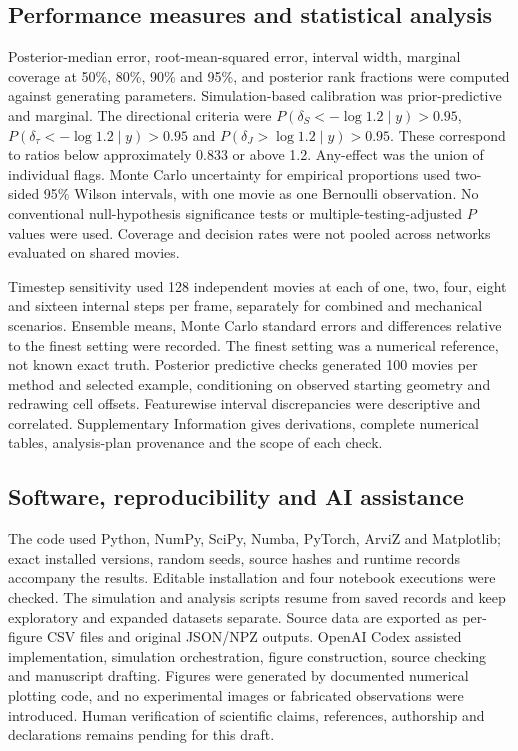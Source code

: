 \documentclass[12pt]{article}
\begin{document}
\subsection*{Performance measures and statistical analysis}
Posterior-median error, root-mean-squared error, interval width, marginal coverage at 50\%, 80\%, 90\% and 95\%, and posterior rank fractions were computed against generating parameters. Simulation-based calibration was prior-predictive and marginal\citep{talts2018,sailynoja2022}. The directional criteria were $P(\delta_S<-\log1.2\mid y)>0.95$, $P(\delta_\tau<-\log1.2\mid y)>0.95$ and $P(\delta_J>\log1.2\mid y)>0.95$. These correspond to ratios below approximately 0.833 or above 1.2. Any-effect was the union of individual flags. Monte Carlo uncertainty for empirical proportions used two-sided 95\% Wilson intervals, with one movie as one Bernoulli observation. No conventional null-hypothesis significance tests or multiple-testing-adjusted $P$ values were used. Coverage and decision rates were not pooled across networks evaluated on shared movies.

Timestep sensitivity used 128 independent movies at each of one, two, four, eight and sixteen internal steps per frame, separately for combined and mechanical scenarios. Ensemble means, Monte Carlo standard errors and differences relative to the finest setting were recorded. The finest setting was a numerical reference, not known exact truth. Posterior predictive checks generated 100 movies per method and selected example, conditioning on observed starting geometry and redrawing cell offsets. Featurewise interval discrepancies were descriptive and correlated. Supplementary Information gives derivations, complete numerical tables, analysis-plan provenance and the scope of each check.

\subsection*{Software, reproducibility and AI assistance}
The code used Python, NumPy, SciPy, Numba, PyTorch, ArviZ and Matplotlib; exact installed versions, random seeds, source hashes and runtime records accompany the results. Editable installation and four notebook executions were checked. The simulation and analysis scripts resume from saved records and keep exploratory and expanded datasets separate. Source data are exported as per-figure CSV files and original JSON/NPZ outputs. OpenAI Codex assisted implementation, simulation orchestration, figure construction, source checking and manuscript drafting. Figures were generated by documented numerical plotting code, and no experimental images or fabricated observations were introduced. Human verification of scientific claims, references, authorship and declarations remains pending for this draft.
\end{document}
